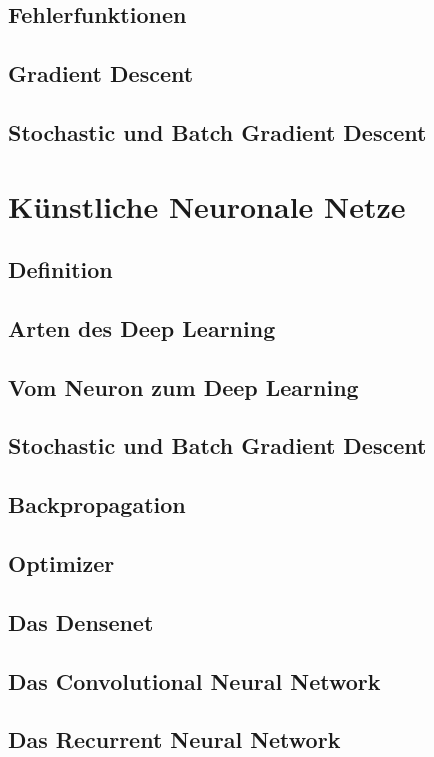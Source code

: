 \documentclass[conference, german]{IEEEtran}
\begin{document}
\subsection{Fehlerfunktionen}
\subsection{Gradient Descent}
\subsection{Stochastic und Batch Gradient Descent}
\section{Künstliche Neuronale Netze}
\subsection{Definition}
\subsection{Arten des Deep Learning}
\subsection{Vom Neuron zum Deep Learning}
\subsection{Stochastic und Batch Gradient Descent}
\subsection{Backpropagation}
\subsection{Optimizer}
\subsection{Das Densenet}
\subsection{Das Convolutional Neural Network}
\subsection{Das Recurrent Neural Network}

\printbibliography
\end{document}
